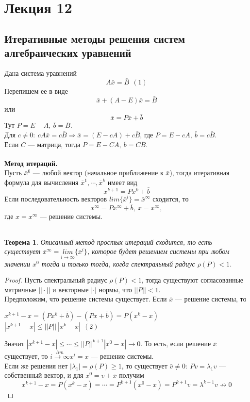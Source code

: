 \documentclass[12pt]{article}
\newtheorem*{theorem}{Теорема}
\begin{document}
	
	\newpage
	\section{Лекция 12}
	\subsection{Итеративные методы решения систем алгебраических уравнений}
	Дана система уравнений $$A\bar x=\bar B~~(1)$$
	Перепишем ее в виде $$\bar x+(A-E)\bar x=\bar B$$
	или $$\bar x=P\bar x+\bar b$$
	Тут $P=E-A,~\bar b=\bar B$.\\
	Для $c\neq 0:~cA\bar x=c\bar B \Rightarrow \bar x=(E-cA)+c\bar B$, где $P=E-cA,~\bar b=c\bar B$.\\
	Если $C$ --- матрица, тогда $P=E-CA,~\bar b=C\bar B$.\\ \\
	\textbf{Метод итераций.}\\
	Пусть $\bar x^0$ --- любой вектор (начальное приближение к $\bar x$), тогда итеративная формула для вычисления $\bar x^1, \cdots, \bar x^k$ имеет вид
	$$x^{k+1}=Px^k+\bar b$$ 
	Если последовательность векторов $lim\{\bar x^i\}=\bar x^{\infty}$ сходится, то $$x^{\infty}=Px^{\infty}+\bar b,~x=x^{\infty},$$
	где $x=x^{\infty}$ --- решение системы.\\
	\\
	\begin{theorem}
		Описанный метод простых итераций сходится, то есть существует $\bar x^{\infty}=\underset{i\to \infty}{lim}\{\bar x^i\}$, которое будет решением системы при любом значении $x^0$ тогда и только тогда, когда спектральный радиус $\rho(P)<1$.
	\end{theorem}
	\begin{proof}
		Пусть спектральный радиус $\rho(P)<1$, тогда существуют согласованные матричные $||\cdot||$ и векторные $|\cdot|$ нормы, что $||P||<1$.\\
	Предположим, что решение системы существует. Если $\bar x$ --- решение системы, то \begin{center}
		$x^{k+1}-x=(Px^k+\bar b)-(Px+\bar b)=P(x^k-x)$\\
		$|x^{k+1}-x|\leqslant||P||~|x^k-x|~~(2)$
	\end{center}
	Значит $|x^{k+1}-x|\leqslant \cdots \leqslant ||P||^{k+1}|x^0-x| \to 0$. То есть, если решение $\bar x$ существует, то $\overset{lim}{i\to \infty}x^i=x$ --- решение системы.\\
	Если же решения нет $|\lambda_1|=\rho(P)\geqslant 1$, то существует $\bar v\neq 0:~Pv=\lambda_1 v$ --- собственный вектор, и для $x^0=v+\bar x$ получим
	$$x^{k+1}-x=P(x^k-x)=\cdots=P^{k+1}(x^0-x)=P^{k+1}v=\lambda^{k+1}v \nrightarrow 0$$
	\end{proof}
\end{document}
